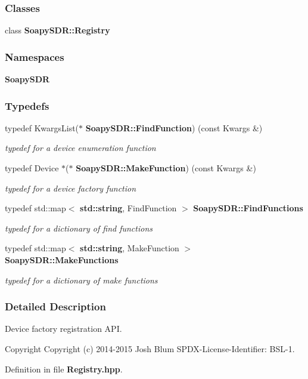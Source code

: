 \subsubsection*{Classes}
\begin{DoxyCompactItemize}
\item 
class {\bf Soapy\+S\+D\+R\+::\+Registry}
\end{DoxyCompactItemize}
\subsubsection*{Namespaces}
\begin{DoxyCompactItemize}
\item 
 {\bf Soapy\+S\+DR}
\end{DoxyCompactItemize}
\subsubsection*{Typedefs}
\begin{DoxyCompactItemize}
\item 
typedef Kwargs\+List($\ast$ {\bf Soapy\+S\+D\+R\+::\+Find\+Function}) (const Kwargs \&)
\begin{DoxyCompactList}\small\item\em typedef for a device enumeration function \end{DoxyCompactList}\item 
typedef Device $\ast$($\ast$ {\bf Soapy\+S\+D\+R\+::\+Make\+Function}) (const Kwargs \&)
\begin{DoxyCompactList}\small\item\em typedef for a device factory function \end{DoxyCompactList}\item 
typedef std\+::map$<$ {\bf std\+::string}, Find\+Function $>$ {\bf Soapy\+S\+D\+R\+::\+Find\+Functions}
\begin{DoxyCompactList}\small\item\em typedef for a dictionary of find functions \end{DoxyCompactList}\item 
typedef std\+::map$<$ {\bf std\+::string}, Make\+Function $>$ {\bf Soapy\+S\+D\+R\+::\+Make\+Functions}
\begin{DoxyCompactList}\small\item\em typedef for a dictionary of make functions \end{DoxyCompactList}\end{DoxyCompactItemize}


\subsubsection{Detailed Description}
Device factory registration A\+PI. 

\begin{DoxyCopyright}{Copyright}
Copyright (c) 2014-\/2015 Josh Blum S\+P\+D\+X-\/\+License-\/\+Identifier\+: B\+S\+L-\/1. 
\end{DoxyCopyright}


Definition in file {\bf Registry.\+hpp}.

